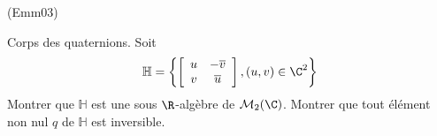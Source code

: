 \begin{tiny}(Emm03)\end{tiny}
Corps des quaternions.\newline
Soit
\begin{displaymath}
 \mathbb{H}=\left\{ \left[
\begin{array}{cc}
u & -\overline{v} \\
v & \overline{u}
\end{array}
\right] ,(u,v)\in \C^{2}\right\}
\end{displaymath}
Montrer que $\mathbb{H}$ est une sous $\R$-alg{\`e}bre de $\mathcal{M}_{2}(\C)$. Montrer que tout {\'e}l{\'e}ment non nul $q$ de $\mathbb{H}$ est inversible.
